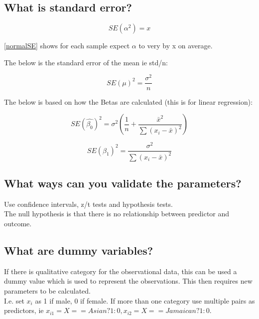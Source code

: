 \documentclass[11pt]{scrartcl} %
\begin{document}
\subsection{What is standard error?}

\begin{equation}
	SE(\alpha^2) = x
	\label{normalSE}
\end{equation}

\ref{normalSE} shows for each sample expect \(\alpha\) to very by x on average.

The below is the standard error of the mean ie std/n:

\begin{equation}
	SE(\mu)^2 = \frac{\sigma^2}{n}
\end{equation}

The below is based on how the Betas are calculated (this is for linear regression):

\begin{equation}
	SE(\hat{\beta_0})^2 = \sigma^2(\frac{1}{n} + \frac{\bar{x}^2}{\sum{(x_i-\bar{x})^2}})
\end{equation}

\begin{equation}
	SE(\beta_1)^2 = \frac{\sigma^2}{\sum{(x_i-\bar{x})^2}}
\end{equation}

\subsection{What ways can you validate the parameters?}

Use confidence intervals, z/t tests and hypothesis tests.\\

The null hypothesis is that there is no relationship between predictor and outcome.

\subsection{What are dummy variables?}

If there is qualitative category for the observational data, this can be used a dummy value which is used to represent
the observations. This then requires new parameters to be calculated.\\

I.e. set \(x_i\) as 1 if male, 0 if female. If more than one category use multiple pairs as predictors, ie 
\(x_{i1} = X==Asian?1:0, x_{i2} = X==Jamaican?1:0\).\\
\end{document}
